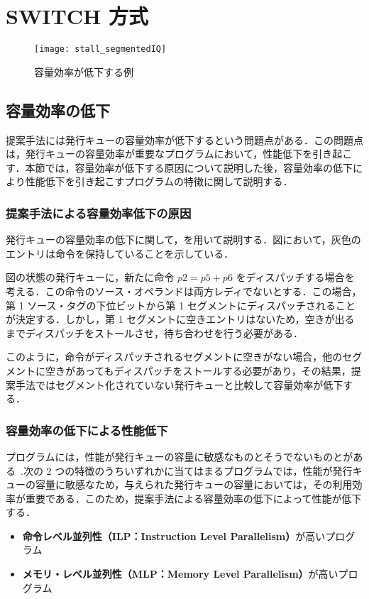 \chapter{SWITCH 方式}
\label{sec:switch}

\begin{figure}[tb]
  \centering
  \texttt{[image: stall\_segmentedIQ]}
  \caption{容量効率が低下する例}
  \label{fig:stall_segmentedIQ}
\end{figure}


\section{容量効率の低下}
\label{sec:occupency_reduction}
提案手法には発行キューの容量効率が低下するという問題点がある．この問題点は，発行キューの容量効率が重要なプログラムにおいて，性能低下を引き起こす．本節では，容量効率が低下する原因について説明した後，容量効率の低下により性能低下を引き起こすプログラムの特徴に関して説明する．

\subsection{提案手法による容量効率低下の原因}
発行キューの容量効率の低下に関して，を用いて説明する．図において，灰色のエントリは命令を保持していることを示している．

図の状態の発行キューに，新たに命令 $p2 = p5 + p6$ をディスパッチする場合を考える．この命令のソース・オペランドは両方レディでないとする．この場合，第 1 ソース・タグの下位ビットから第 1 セグメントにディスパッチされることが決定する．しかし，第 1 セグメントに空きエントリはないため，空きが出るまでディスパッチをストールさせ，待ち合わせを行う必要がある．

このように，命令がディスパッチされるセグメントに空きがない場合，他のセグメントに空きがあってもディスパッチをストールする必要があり，その結果，提案手法ではセグメント化されていない発行キューと比較して容量効率が低下する．

\subsection{容量効率の低下による性能低下}
プログラムには，性能が発行キューの容量に敏感なものとそうでないものとがある~\cite{Ando2019, Kora2013, Sembrant2015}.次の 2 つの特徴のうちいずれかに当てはまるプログラムでは，性能が発行キューの容量に敏感なため，与えられた発行キューの容量においては，その利用効率が重要である．このため，提案手法による容量効率の低下によって性能が低下する．
\begin{itemize}
  \item \textbf{命令レベル並列性（ILP：Instruction Level Parallelism）}が高いプログラム
  \item \textbf{メモリ・レベル並列性（MLP：Memory Level Parallelism）}が高いプログラム 
\end{itemize}

